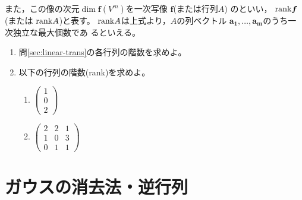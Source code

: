\documentclass[twocolumn,11pt]{jarticle}
\begin{document}
また，この像の次元$\dim \boldsymbol{f}(V^m)$を一次写像
$\boldsymbol{f}$(または行列$A$)
のといい，
$\mbox{rank} \boldsymbol{f}$ (または $\mbox{rank} A$)と表す。
$\mbox{rank} A$は上式より，$A$の列ベクトル
$\boldsymbol{a_1},\ldots,\boldsymbol{a_m}$のうち一次独立な最大個数であ
るといえる。 

\begin{enumerate}
\item 問\ref{sec:linear-trans}の各行列の階数を求めよ。
\item 以下の行列の階数(rank)を求めよ。
  \begin{enumerate}
  \item 
    $\begin{pmatrix}
      1\\
      0\\
      2
    \end{pmatrix}$
  \item 
    $\begin{pmatrix}
      2 & 2 & 1\\
      1 & 0 & 3\\
      0 & 1 & 1
    \end{pmatrix}$
  \end{enumerate}
\end{enumerate}%

\section{ガウスの消去法・逆行列}
\end{document}
